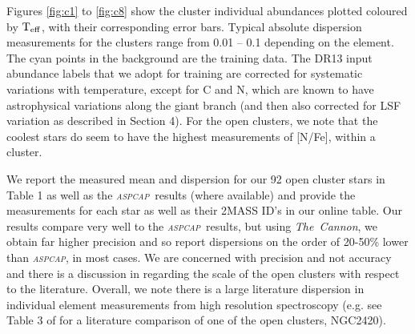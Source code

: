 \documentclass[14pt, preprint2]{aastex6}
\newcommand{\project}[1]{\textsl{#1}}
\newcommand{\tc}{\project{The~Cannon}}
\newcommand{\aspcap}{\project{\textsc{aspcap}}}
\newcommand{\teff}{\mbox{$\rm T_{eff}$}}
\begin{document}
Figures \ref{fig:c1} to \ref{fig:c8} show the cluster individual abundances plotted coloured by \teff, with their corresponding error bars. Typical absolute dispersion measurements for the clusters range from 0.01 -- 0.1 depending on the element.  The cyan points in the background are the training data. The DR13 input abundance labels that we adopt for training are corrected for systematic variations with temperature, except for C and N, which are known to have astrophysical variations along the giant branch (and then also corrected for LSF variation as described in Section 4). For the open clusters, we note that the coolest stars do seem to have the highest measurements of [N/Fe], within a cluster. 

We report the measured mean and dispersion for our 92 open cluster stars in Table 1 as well as the \aspcap\ results (where available) and provide the measurements for each star as well as their 2MASS ID's in our online table. Our results compare very well to the \aspcap\ results, but using \tc, we obtain far higher precision and so report dispersions on the order of 20-50\% lower than \aspcap, in most cases. We are concerned with precision and not accuracy and there is a discussion in \citet{Holtzman2015} regarding the scale of the open clusters with respect to the literature. Overall, we note there is a large literature dispersion in individual element measurements from high resolution spectroscopy (e.g. see Table 3 of \citet{Souto2016} for a literature comparison of one of the open clusters, NGC2420). 
\end{document}
